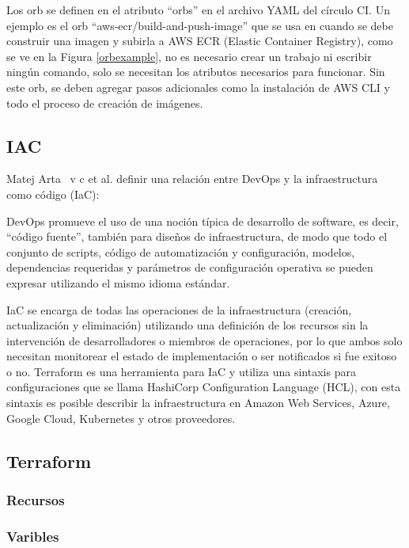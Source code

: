 Los orb se definen en el atributo ``orbs'' en el archivo YAML del círculo CI. Un ejemplo es el orb ``aws-ecr/build-and-push-image'' que se usa en cuando se debe construir una imagen y subirla a AWS ECR (Elastic Container Registry), como se ve en la Figura \ref{orbexample}, no es necesario crear un trabajo ni escribir ningún comando, solo se necesitan los atributos necesarios para funcionar. Sin este orb, se deben agregar pasos adicionales como la instalación de AWS CLI y todo el proceso de creación de imágenes.

\subsection {IAC}

Matej Arta \ v {c} et al. definir una relación entre DevOps y la infraestructura como código (IaC):

\relax
{}\relax

DevOps promueve el uso de una noción típica de desarrollo de software, es decir, ``código fuente'', también para diseños de infraestructura, de modo que todo el conjunto de scripts, código de automatización y configuración, modelos, dependencias requeridas y parámetros de configuración operativa se pueden expresar utilizando el mismo idioma estándar. \cite{devopsiac}

\relax
{}\relax

IaC se encarga de todas las operaciones de la infraestructura (creación, actualización y eliminación) utilizando una definición de los recursos sin la intervención de desarrolladores o miembros de operaciones, por lo que ambos solo necesitan monitorear el estado de implementación o ser notificados si fue exitoso o no.
Terraform \cite{terraform} es una herramienta para IaC y utiliza una sintaxis para configuraciones que se llama HashiCorp Configuration Language (HCL), con esta sintaxis es posible describir la infraestructura en Amazon Web Services, Azure, Google Cloud, Kubernetes y otros proveedores.

\subsection {Terraform}
\subsubsection {Recursos}
\subsubsection {Varibles}
